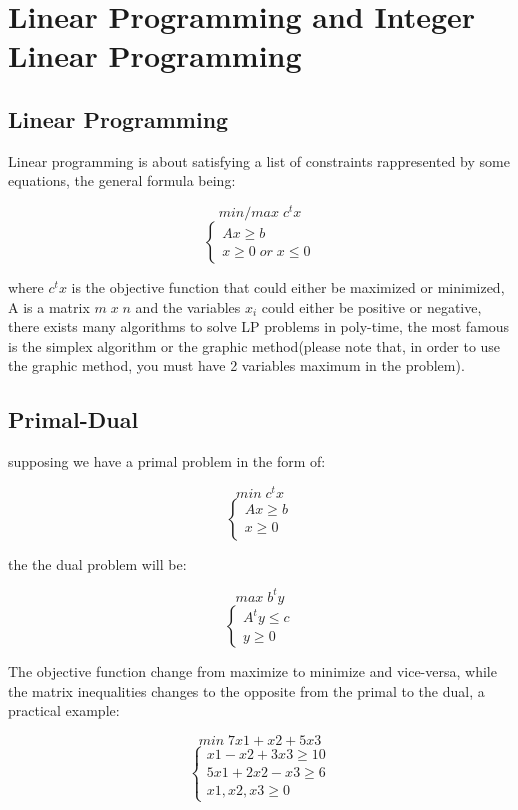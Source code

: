 \section{Linear Programming and Integer Linear Programming}

\subsection{Linear Programming}

Linear programming is about satisfying a list of constraints rappresented by some equations, the general formula being:

\[min/max \; c^{t}x\]
\[\begin{cases} Ax \geq b \\ x \geq 0 \; or \; x \leq 0 \end{cases}\]

where $c^{t}x$ is the objective function that could either be maximized or minimized, A is a matrix $m \; x \; n$ and the variables $x_{i}$ could either be positive or negative, there exists many algorithms to solve LP problems in poly-time, the most famous is the simplex algorithm or the graphic method(please note that, in order to use the graphic method, you must have 2 variables maximum in the problem).

\subsection{Primal-Dual}
supposing we have a primal problem in the form of:

\[min \; c^{t}x\]
\[\begin{cases} Ax \geq b \\ x \geq 0 \end{cases}\]

the the dual problem will be:

\[max \; b^{t}y\]
\[\begin{cases} A^{t}y \leq c \\ y \geq 0 \end{cases}\]

The objective function change from maximize to minimize and vice-versa, while the matrix inequalities changes to the opposite from the primal to the dual, a practical example:

\[min \; 7x1 + x2 + 5x3\]
\[\begin{cases} x1-x2+3x3 \geq 10 \\ 5x1+2x2-x3 \geq 6 \\ x1,x2,x3 \geq 0 \end{cases}\]

